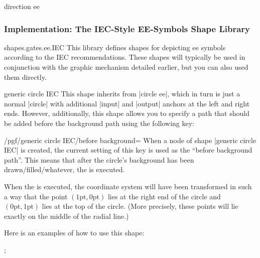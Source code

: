 \begin{shape}{direction ee}
\begin{codeexample}[]
\end{codeexample}
\end{shape}


\subsubsection{Implementation: The IEC-Style EE-Symbols Shape Library}

\begin{pgflibrary}{shapes.gates.ee.IEC}
    This library defines shapes for depicting ee symbols according to the IEC
    recommendations. These shapes will typically be used in conjunction with
    the graphic mechanism detailed earlier, but you can also used them
    directly.
\end{pgflibrary}

\begin{shape}{generic circle IEC}
    This shape inherits from |circle ee|, which in turn is just a normal
    |circle| with additional |input| and |output| anchors at the left and right
    ends. However, additionally, this shape allows you to specify a path that
    should be added before the background path using the following key:
    \begin{key}{/pgf/generic circle IEC/before background=}
        When a node of shape |generic circle IEC| is created, the current
        setting of this key is used as the ``before background path''. This
        means that after the circle's background has been
        drawn/filled/whatever, the  is executed.

        When the  is executed, the coordinate system will have been
        transformed in such a way that the point $(1\mathrm{pt},0\mathrm{pt})$
        lies at the right end of the circle and $(0\mathrm{pt},1\mathrm{pt})$
        lies at the top of the circle. (More precisely, these points will lie
        exactly on the middle of the radial line.)
    \end{key}
    Here is an examples of how to use this shape:
\begin{codeexample}[]
\tikz {};
\end{codeexample}
\end{shape}

